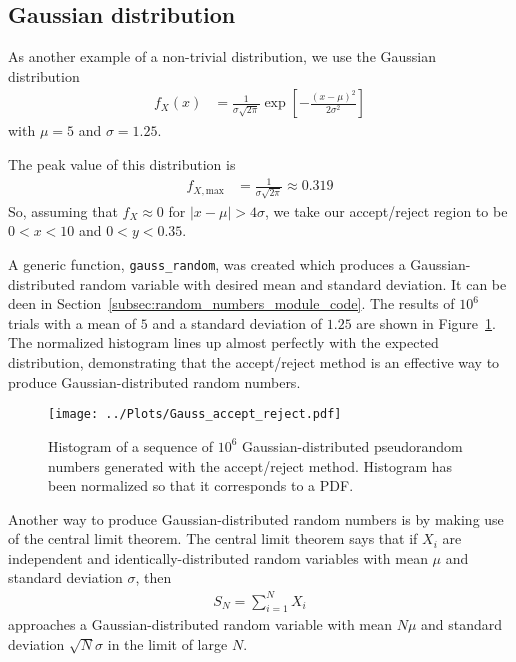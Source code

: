\documentclass[twocolumn]{myarticle}
\begin{document}
\subsection{Gaussian distribution}
\label{subsec:gaussian_distribution}

As another example of a non-trivial distribution, we use the Gaussian distribution
\begin{align}
    f_X(x) &= \frac{1}{\sigma \sqrt{2 \pi}} \exp \left[ - \frac{(x - \mu)^2}{2 \sigma^2} \right]
\end{align}
with $ \mu = 5 $ and $ \sigma = 1.25 $.

The peak value of this distribution is
\begin{align}
    f_{X,\text{max}} &= \frac{1}{\sigma \sqrt{2 \pi}} \approx 0.319
\end{align}
So, assuming that $ f_X \approx 0 $ for $ |x - \mu| > 4 \sigma $, we take our accept/reject region to be $ 0 < x < 10 $ and $ 0 < y < 0.35 $.

A generic function, \texttt{gauss\_random}, was created which produces a Gaussian-distributed random variable with desired mean and standard deviation. 
It can be deen in Section~\ref{subsec:random_numbers_module_code}.
The results of $ 10^6 $ trials with a mean of $ 5 $ and a standard deviation of $ 1.25 $ are shown in Figure~\ref{fig:gauss_accept_reject}.
The normalized histogram lines up almost perfectly with the expected distribution, demonstrating that the accept/reject method is an effective way to produce Gaussian-distributed random numbers.

\begin{figure}[ht!]
    \begin{center}
    \texttt{[image: ../Plots/Gauss\_accept\_reject.pdf]}
    \caption{%
        Histogram of a sequence of $ 10^6 $ Gaussian-distributed pseudorandom numbers generated with the accept/reject method.
        Histogram has been normalized so that it corresponds to a PDF.
    }
    \label{fig:gauss_accept_reject}
    \end{center}
\end{figure}

Another way to produce Gaussian-distributed random numbers is by making use of the central limit theorem.
The central limit theorem says that if $ X_i $ are independent and identically-distributed random variables with mean $ \mu $ and standard deviation $ \sigma $, then
\begin{align}
    S_N = \sum_{i=1}^N X_i
\end{align}
approaches a Gaussian-distributed random variable with mean $ N \mu $ and standard deviation $ \sqrt{N} \sigma $ in the limit of large $ N $.
\end{document}
